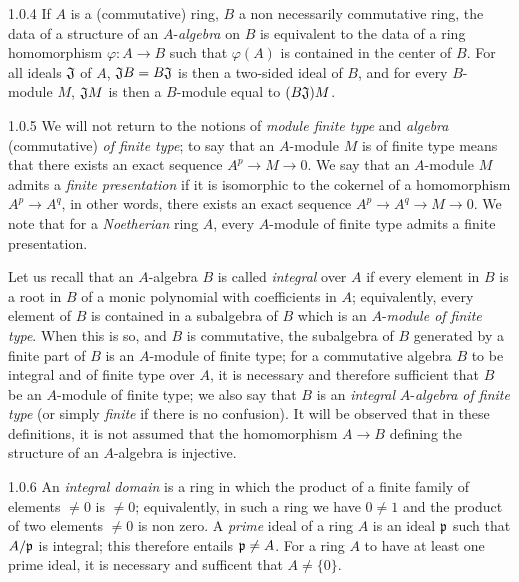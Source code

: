 \documentclass[../main.tex]{subfiles}
\begin{document}
\begin{cx}{1.0.4}
If $A$ is a (commutative) ring, $B$ a non necessarily commutative ring, the data of
a structure of an $A$-\emph{algebra} on $B$ is equivalent to the data of a ring
homomorphism $\varphi:A\to B$ such that $\varphi(A)$ is contained in the center of $B$.
For all ideals $\mathfrak{J}$ of $A$, $\mathfrak{J}B=B\mathfrak{J}$ is then a two-sided ideal of $B$, and
for every $B$-module $M$, $\mathfrak{J}M$ is then a $B$-module equal to $(B\mathfrak{J})M$.
\end{cx}

\begin{cx}{1.0.5}
We will not return to the notions of \emph{module finite type} and
\emph{algebra} (commutative) \emph{of finite type}; to say that an $A$-module $M$
is of finite type means that there exists an exact sequence $A^p\to M\to 0$. We say that
an $A$-module $M$ admits a \emph{finite presentation} if it is isomorphic to the cokernel
of a homomorphism $A^p\to A^q$, in other words, there exists an exact sequence
$A^p\to A^q\to M\to 0$. We note that for a \emph{Noetherian} ring $A$, every $A$-module
of finite type admits a finite presentation.

Let us recall that an $A$-algebra $B$ is called \emph{integral} over $A$ if every element
in $B$ is a root in $B$ of a monic polynomial with coefficients in $A$; equivalently, every
element of $B$ is contained in a subalgebra of $B$ which is an $A$-\emph{module of finite type}.
When this is so, and $B$ is commutative, the subalgebra of $B$ generated by a finite part of
$B$ is an $A$-module of finite type; for a commutative algebra $B$ to be integral and of finite
type over $A$, it is necessary and therefore sufficient that $B$ be an $A$-module of finite
type; we also say that $B$ is an \emph{integral} $A$-\emph{algebra of finite type} (or
simply \emph{finite} if there is no confusion). It will be observed that in these definitions,
it is not assumed that the homomorphism $A\to B$ defining the structure of an $A$-algebra
is injective.
\end{cx}

\begin{cx}{1.0.6}
An \emph{integral domain} is a ring in which the product of a finite family of elements
$\neq 0$ is $\neq 0$; equivalently, in such a ring we have $0\neq 1$ and the product of
two elements $\neq 0$ is non zero. A \emph{prime} ideal of a ring $A$ is an ideal $\mathfrak{p}$
such that $A/\mathfrak{p}$ is integral; this therefore entails $\mathfrak{p}\neq A$. For a ring $A$ to
have at least one prime ideal, it is necessary and sufficent that $A\neq\{0\}$.
\end{cx}
\end{document}
